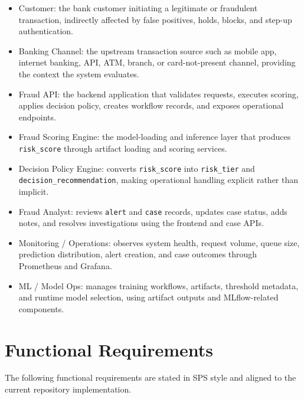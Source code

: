 \documentclass[11pt]{article}
\newcommand{\code}[1]{\texttt{#1}}
\begin{document}
\begin{itemize}
  \item Customer: the bank customer initiating a legitimate or fraudulent transaction, indirectly affected by false positives, holds, blocks, and step-up authentication.
  \item Banking Channel: the upstream transaction source such as mobile app, internet banking, API, ATM, branch, or card-not-present channel, providing the context the system evaluates.
  \item Fraud API: the backend application that validates requests, executes scoring, applies decision policy, creates workflow records, and exposes operational endpoints.
  \item Fraud Scoring Engine: the model-loading and inference layer that produces \code{risk_score} through artifact loading and scoring services.
  \item Decision Policy Engine: converts \code{risk_score} into \code{risk_tier} and \code{decision_recommendation}, making operational handling explicit rather than implicit.
  \item Fraud Analyst: reviews \code{alert} and \code{case} records, updates case status, adds notes, and resolves investigations using the frontend and case APIs.
  \item Monitoring / Operations: observes system health, request volume, queue size, prediction distribution, alert creation, and case outcomes through Prometheus and Grafana.
  \item ML / Model Ops: manages training workflows, artifacts, threshold metadata, and runtime model selection, using artifact outputs and MLflow-related components.
\end{itemize}

\section{Functional Requirements}
The following functional requirements are stated in SPS style and aligned to the current repository implementation.
\end{document}
